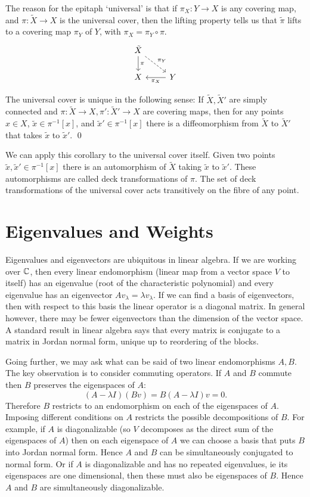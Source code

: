 The reason for the epitaph `universal' is that if $\pi_X : Y \to X$ is any covering map, and $\pi : \tilde{X} \to X$ is the universal cover, then the lifting property tells us that $\tilde{\pi}$ lifts to a covering map $\pi_Y$ of $Y$, with $\pi_X = \pi_Y \circ \pi$.
\[\begin{tikzcd}
\tilde{X} \arrow{d}{\pi} \arrow[dashed]{rd}{\pi_Y} & \\
X & Y \arrow{l}{\pi_X}
\end{tikzcd}\]



\begin{corollary}
The universal cover is unique in the following sense:
If $\tilde{X},\tilde{X}'$ are simply connected and $\pi : \tilde{X} \to X, \pi': \tilde{X}'\to X$ are covering maps, then for any points $x \in X$, $\tilde{x} \in \pi^{-1}[x]$, and $\tilde{x}' \in \pi^{-1}[x]$ there is a diffeomorphism from $\tilde{X}$ to $\tilde{X}'$ that takes $\tilde{x}$ to $\tilde{x}'$.
\qed
\end{corollary}

We can apply this corollary to the universal cover itself.
Given two points $\tilde{x},\tilde{x}' \in \pi^{-1}[x]$ there is an automorphism of $\tilde{X}$ taking $\tilde{x}$ to $\tilde{x}'$.
These automorphisms are called deck transformations of $\pi$.
The set of deck transformations of the universal cover acts transitively on the fibre of any point.



\section{Eigenvalues and Weights}

Eigenvalues and eigenvectors are ubiquitous in linear algebra.
If we are working over $\mathbb{C}$, then every linear endomorphism (linear map from a vector space $V$ to itself) has an eigenvalue (root of the characteristic polynomial) and every eigenvalue has an eigenvector $Av_\lambda = \lambda v_\lambda$.
If we can find a basis of eigenvectors, then with respect to this basis the linear operator is a diagonal matrix.
In general however, there may be fewer eigenvectors than the dimension of the vector space.
A standard result in linear algebra says that every matrix is conjugate to a matrix in Jordan normal form, unique up to reordering of the blocks.

Going further, we may ask what can be said of two linear endomorphisms $A,B$.
The key observation is to consider commuting operators.
If $A$ and $B$ commute then $B$ preserves the eigenspaces of $A$:
\[
(A- \lambda I) (Bv) 
= B(A- \lambda I) v
= 0.
\]
Therefore $B$ restricts to an endomorphism on each of the eigenspaces of $A$.
Imposing different conditions on $A$ restricts the possible decompositions of $B$.
For example, if $A$ is diagonalizable (so $V$ decomposes as the direct sum of the eigenspaces of $A$) then on each eigenspace of $A$ we can choose a basis that puts $B$ into Jordan normal form.
Hence $A$ and $B$ can be simultaneously conjugated to normal form.
Or if $A$ is diagonalizable and has no repeated eigenvalues, ie its eigenspaces are one dimensional, then these must also be eigenspaces of $B$.
Hence $A$ and $B$ are simultaneously diagonalizable.

